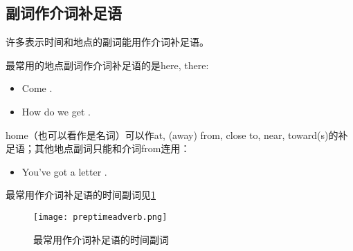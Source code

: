\subsection{副词作介词补足语}
\label{subsec:adverbprep}

许多表示时间和地点的副词能用作介词补足语。

最常用的地点副词作介词补足语的是here, there:
\begin{itemize}
\item Come .
\item How do we get .
\end{itemize}
home（也可以看作是名词）可以作at, (away) from, close to, near, toward(s)的补
足语；其他地点副词只能和介词from连用：
\begin{itemize}
\item You've got a letter .
\end{itemize}

最常用作介词补足语的时间副词见\cref{fig:preptimeadv}
\begin{figure}[ht]
  \centering
  \texttt{[image: preptimeadverb.png]}
  \caption{\label{fig:preptimeadv}最常用作介词补足语的时间副词}
\end{figure}






